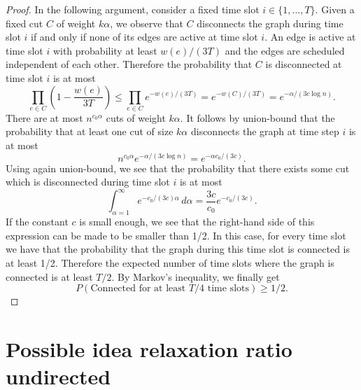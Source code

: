 \documentclass[runningheads]{llncs}
\numberwithin{equation}{section}
\newcommand{\set}[1]{\{ #1 \}}
\newcommand{\fromto}[2]{\set{#1, \ldots, #2}}
\begin{document}
\begin{proof}
In the following argument, consider a fixed time slot $i \in \fromto{1}{T}$. Given a fixed cut $C$ of weight $k\alpha$, 
we observe that $C$ disconnects the graph during time slot $i$ if and only if none of its edges are active at time slot $i$. An edge is active at time slot $i$ with probability at least $w(e)/(3T)$ and the edges are scheduled independent of each other.
 Therefore the probability that $C$ is disconnected at time slot $i$ is at most 
\[
\prod_{e \in C}(1-\frac{w(e)}{3T}) \leq \prod_{e \in C} e^{-w(e)/(3T)} = e^{-w(C)/(3T)} = e^{-\alpha/(3c \log n)}.
\]
There are at most $n^{c_0\alpha}$ cuts of weight $k\alpha$. It follows by union-bound that the probability that at least one cut of size $k\alpha$ disconnects the graph at time step $i$ is at most 
\[ n^{c_0\alpha} e^{-\alpha/(3c \log n)} = e^{-\alpha c_0/(3c)}.\]
Using again union-bound, we see that the probability that there exists some cut which is disconnected during time slot $i$ is at most
\[\int_{\alpha=1}^\infty e^{- c_0/(3c)\alpha} \, d\alpha =  \frac{3c}{c_0}e^{-c_0/(3c)}.\]
If the constant $c$ is small enough, we see that the right-hand side of this expression can be made to be smaller than 1/2. In this case, for every time slot we have that the probability that the graph during this time slot is connected is at least 1/2. Therefore the expected number of time slots where the graph is connected is at least $T/2$. By Markov's inequality, we finally get
\[P(\text{Connected for at least $T/4$ time slots}) \geq 1/2.\]   
\end{proof}

\section{Possible idea relaxation ratio undirected}
\end{document}
